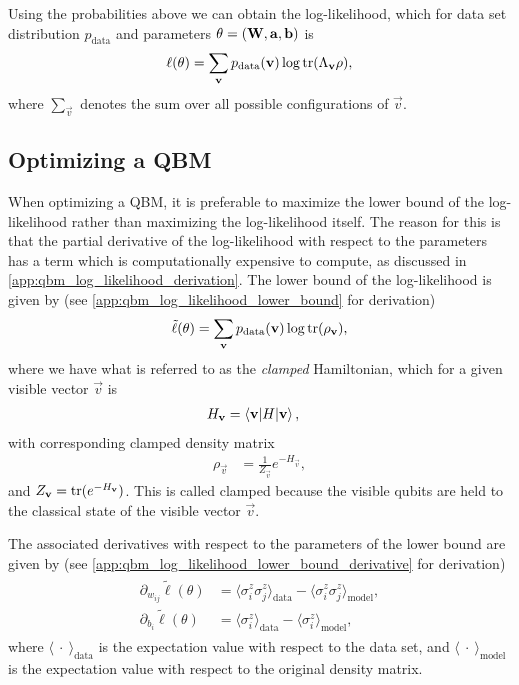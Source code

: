 Using the probabilities above we can obtain the log-likelihood, which for data set distribution \( p_\text{data} \) and parameters \( \theta = (\mathbf{W}, \mathbf{a}, \mathbf{b}) \) is
\begin{align}
    \ell(\theta) = \sum_{\mathbf{v}} p_{\text{data}}(\mathbf{v}) \log \text{tr}(\Lambda_{\mathbf{v}}\rho),
\end{align}
where \( \sum_{\vec{v}} \) denotes the sum over all possible configurations of \( \vec{v} \).

\subsection{Optimizing a QBM}
When optimizing a QBM, it is preferable to maximize the lower bound of the log-likelihood rather than maximizing the log-likelihood itself.
The reason for this is that the partial derivative of the log-likelihood with respect to the parameters has a term which is computationally expensive to compute, as discussed in \cref{app:qbm_log_likelihood_derivation}.
The lower bound of the log-likelihood is given by (see \cref{app:qbm_log_likelihood_lower_bound} for derivation)
\begin{align}
    \tilde{\ell}(\theta) = \sum_{\mathbf{v}} p_{\text{data}}(\mathbf{v}) \log \text{tr}(\rho_{\mathbf{v}}),
\end{align}
where we have what is referred to as the \textit{clamped} Hamiltonian, which for a given visible vector \( \vec{v} \) is
\begin{align}
    H_{\mathbf{v}}
        &= \braket{\mathbf{v}|H|\mathbf{v}},
\end{align}
with corresponding clamped density matrix
\begin{align}
    \rho_\vec{v}
        &= \frac{1}{Z_\vec{v}} e^{-H_\vec{v}},
\end{align}
and \( Z_{\mathbf{v}} = \text{tr}(e^{-H_{\mathbf{v}}}) \).
This is called clamped because the visible qubits are held to the classical state of the visible vector \( \vec{v} \).

The associated derivatives with respect to the parameters of the lower bound are given by (see \cref{app:qbm_log_likelihood_lower_bound_derivative} for derivation)
\begin{align}
\begin{split}
    \partial_{w_{ij}} \tilde{\ell}(\theta)
        &= \langle \sigma_i^z \sigma_j^z \rangle_\text{data} - \langle \sigma_i^z \sigma_j^z \rangle_\text{model}, \\
    \partial_{b_i} \tilde{\ell}(\theta)
        &= \langle \sigma_i^z \rangle_\text{data} - \langle \sigma_i^z \rangle_\text{model},
\end{split}
\end{align}
where \( \langle \ \cdot \ \rangle_\text{data} \) is the expectation value with respect to the data set, and \( \langle \ \cdot \ \rangle_\text{model} \) is the expectation value with respect to the original density matrix.

